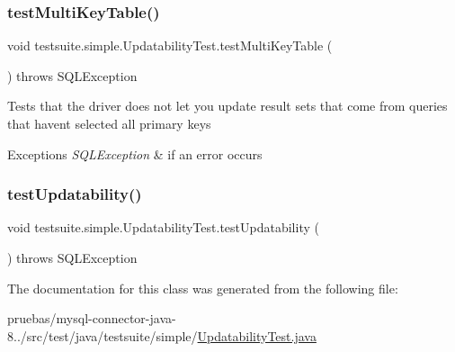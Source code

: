 \subsubsection{\texorpdfstring{test\+Multi\+Key\+Table()}{testMultiKeyTable()}}
{\footnotesize\ttfamily void testsuite.\+simple.\+Updatability\+Test.\+test\+Multi\+Key\+Table (\begin{DoxyParamCaption}{ }\end{DoxyParamCaption}) throws S\+Q\+L\+Exception}

Tests that the driver does not let you update result sets that come from queries that haven\textquotesingle{}t selected all primary keys


\begin{DoxyExceptions}{Exceptions}
{\em S\+Q\+L\+Exception} & if an error occurs \\
\hline
\end{DoxyExceptions}
\mbox{\label{classtestsuite_1_1simple_1_1_updatability_test_ab12c72b9cf7dfb5229204bd6bb482c4c}} 
\subsubsection{\texorpdfstring{test\+Updatability()}{testUpdatability()}}
{\footnotesize\ttfamily void testsuite.\+simple.\+Updatability\+Test.\+test\+Updatability (\begin{DoxyParamCaption}{ }\end{DoxyParamCaption}) throws S\+Q\+L\+Exception}



The documentation for this class was generated from the following file\+:\begin{DoxyCompactItemize}
\item 
pruebas/mysql-\/connector-\/java-\/8../src/test/java/testsuite/simple/\mbox{\hyperlink{_updatability_test_8java}{Updatability\+Test.\+java}}\end{DoxyCompactItemize}
